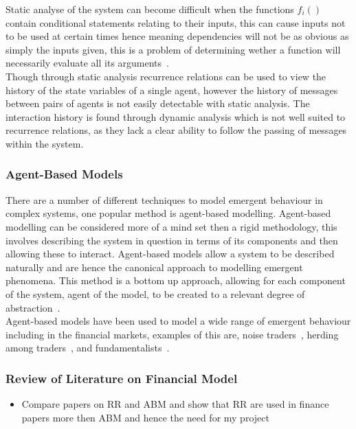 \documentclass{article}
\begin{document}
Static analyse of the system can become difficult when the functions $f_{i}()$ contain conditional statements relating to their inputs, this can cause inputs not to be used at certain times hence meaning dependencies will not be as obvious as simply the inputs given, this is a problem of determining wether a function will necessarily evaluate all its arguments~\cite{willevaluteargsa}.\\
Though through static analysis recurrence relations can be used to view the history of the state variables of a single agent, however the history of messages between pairs of agents is not easily detectable with static analysis. The interaction history is found through dynamic analysis which is not well suited to recurrence relations, as they lack a clear ability to follow the passing of messages within the system.   


\subsubsection{Agent-Based Models}
There are a number of different techniques to model emergent behaviour in complex systems, one popular method is agent-based modelling. Agent-based modelling can be considered more of a mind set then a rigid methodology, this involves describing the system in question in terms of its components and then allowing these to interact. Agent-based models allow a system to be described naturally and are hence the canonical approach to modelling emergent phenomena. This method is a bottom up approach, allowing for each component of the system, agent of the model, to be created to a relevant degree of abstraction~\cite{abmhumsystems}.\\
Agent-based models have been used to model a wide range of emergent behaviour including in the financial markets, examples of this are, noise traders~\cite{abmnoisetraders}, herding among traders~\cite{abmherding}, and fundamentalists~\cite{abmfundemetilists}.

\subsubsection{Review of Literature on Financial Model} \label{litreviewofabmrr}


\begin{itemize}
  \item Compare papers on RR and ABM and show that RR are used in finance papers more then ABM and hence the need for my project 
\end{itemize}
\end{document}
